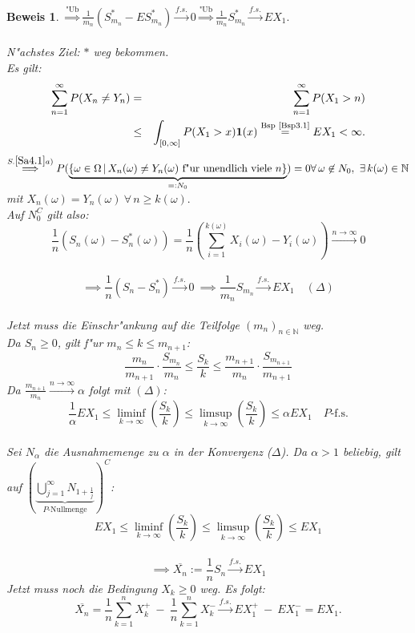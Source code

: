 \documentclass[a4paper,11pt]{book}
\newcommand{\N}{{\mathbb N}}
\newcommand{\ind}{\text{\bf{1}}}
\def\folgt{\ensuremath{\implies}}
\def\fs{\stackrel{f.s.}{\rightarrow }}
\theoremstyle{nonumberplain}
\newtheorem{Bew}{Beweis}
\begin{document}
\begin{Bew}
$\stackrel{\text{"Ub}}{\Longrightarrow} \frac1{m_n} (S_{m_n}^{\ast}-ES_{m_n}^{\ast}) \fs 0 \stackrel{\text{"Ub}}{\Longrightarrow} \frac1{m_n} S_{m_n}^{\ast} \fs EX_1.$\\
\\
N"achstes Ziel: $\ast$ weg bekommen.\\
Es gilt:
\begin{eqnarray*}
\sum_{n=1}^{\infty} P(X_n \not= Y_n) & = & \sum_{n=1}^{\infty} P(X_1 > n) \\
& \leq & \int_{[0,\infty]} P(X_1>x) \ind(x) \stackrel{\text{Bsp \ref{Bsp3.1}}}{=} EX_1 < \infty.
\end{eqnarray*}
$\stackrel{S.\ref{Sa4.1} a)}{\Longrightarrow} P(\underbrace{\{ \omega \in \Omega \, | \, X_n(\omega) \not= Y_n(\omega) \text{ f"ur unendlich viele }n \}}_{=:N_0}) = 0\\
\forall\, \omega \not\in N_0,\ \exists\, k(\omega) \in \N$ mit $X_n(\omega) = Y_n(\omega) \ \forall\, n \geq k(\omega).$\\
Auf $N_0^C$ gilt also: \\
$$\frac{1}{n}(S_n(\omega)-S_n^*(\omega)) = \frac{1}{n}(\sum_{i=1}^{k(\omega)}X_i(\omega)-Y_i(\omega))\stackrel{n\to\infty}{\to}0 $$\\$$
\folgt\frac{1}{n}(S_n-S_n^*)\fs 0\ \folgt\frac{1}{m_n}S_{m_n}\fs EX_1\quad(\Delta)$$ \\
Jetzt muss die Einschr"ankung auf die Teilfolge $(m_n)_{n\in\N}$ weg. \\
Da $S_n\geq0$, gilt f"ur $m_n\leq k\leq m_{n+1}$:
$$\frac{m_n}{m_{n+1}}\cdot\frac{S_{m_n}}{m_n} \leq \frac{S_k}{k} \leq \frac{m_{n+1}}{m_n}\cdot\frac{S_{m_{n+1}}}{m_{n+1}}$$
Da $\frac{m_{n+1}}{m_n}\stackrel{n\to\infty}{\to}\alpha$ folgt mit $(\Delta)$:
$$\frac{1}{\alpha}EX_1 \leq \liminf_{k\to\infty}(\frac{S_k}{k}) \leq \limsup_{k\to\infty}(\frac{S_k}{k}) \leq \alpha EX_1\quad P\text{-f.s.}$$ \\
Sei $N_\alpha$ die Ausnahmemenge zu $\alpha$ in der Konvergenz ($\Delta$). Da $\alpha > 1$ beliebig, gilt auf $(\underbrace{\bigcup_{j=1}^{\infty}N_{1+\frac{1}{j}}}_{P\text{-Nullmenge}})^C$:
$$EX_1 \leq \liminf_{k\to\infty}(\frac{S_k}{k}) \leq \limsup_{k\to\infty}(\frac{S_k}{k}) \leq EX_1 $$\\$$
\folgt \overline{X_n}:=\frac{1}{n}S_n\fs EX_1$$
Jetzt muss noch die Bedingung $X_k \geq 0$ weg. Es folgt:
$$\overline{X_n} = \frac{1}{n}\sum_{k=1}^n X_k^+\ - \ \frac{1}{n}\sum_{k=1}^n X_k^- \fs EX_1^+\ -\ EX_1^- = EX_1.$$\ 
\end{Bew}
\end{document}
